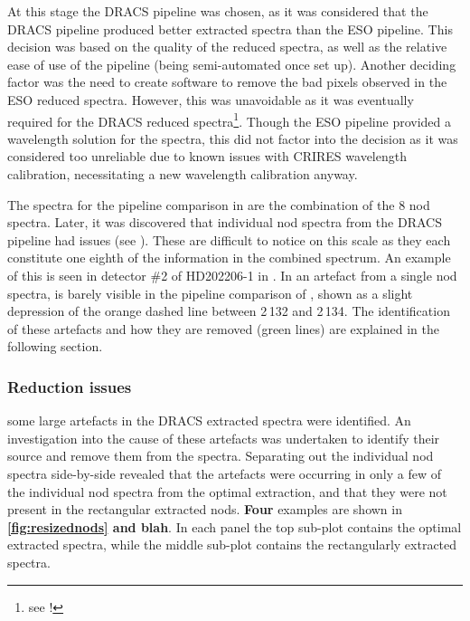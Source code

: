 At this stage the {DRACS} pipeline was chosen, as it was considered that the {DRACS} pipeline produced better extracted spectra than the {ESO} pipeline. This decision was based on the quality of the reduced spectra, as well as the relative ease of use of the pipeline (being semi-automated once set up). Another deciding factor was the need to create software to remove the bad pixels observed in the {ESO} reduced spectra. However, this was unavoidable as it was eventually required for the {DRACS} reduced spectra\footnote{see !}. Though the {ESO} pipeline provided a wavelength solution for the spectra, this did not factor into the decision as it was considered too unreliable due to known issues with {CRIRES} wavelength calibration, necessitating a new wavelength calibration anyway.

The spectra for the pipeline comparison in  are the combination of the 8 nod spectra. Later, it was discovered that individual nod spectra from the {DRACS} pipeline had issues (see ). These are difficult to notice on this scale as they each constitute one eighth of the information in the combined spectrum. An example of this is seen in detector \#2 of {HD202206-1} in . In  an artefact from a single nod spectra, is barely visible in the pipeline comparison of , shown as a slight depression of the orange dashed line between 2\,132 and 2\,134\nm{}. The identification of these artefacts and how they are removed (green lines) are explained in the following section.

\subsubsection{Reduction issues}
\label{subsubsec:reductionartefacts}
\textbf{} some large artefacts in the {DRACS} extracted spectra were identified. An investigation into the cause of these artefacts was undertaken to identify their source and remove them from the spectra. Separating out the individual nod spectra side-by-side revealed that the artefacts were occurring in only a few of the individual nod spectra from the optimal extraction, and that they were not present in the rectangular extracted nods. \textbf{Four} examples are shown in \textbf{\ref{fig:resizednods} and blah}. In each panel the top sub-plot contains the optimal extracted spectra, while the middle sub-plot contains the rectangularly extracted spectra.


